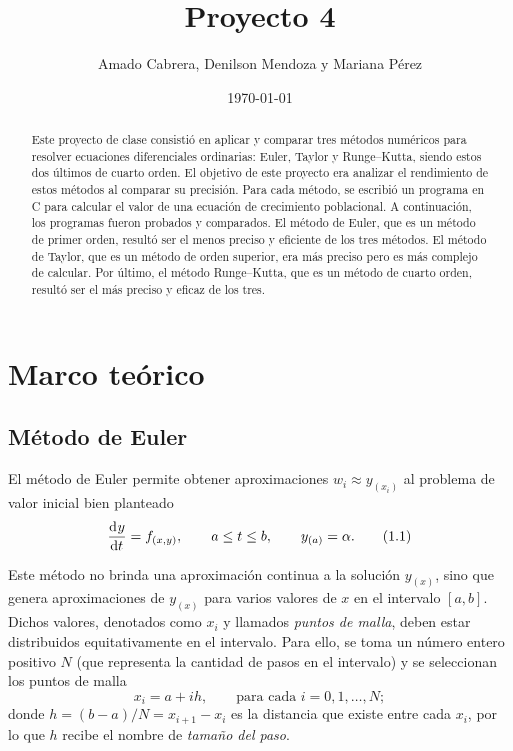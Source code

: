 \documentclass[
    english, spanish, Ce-table, Ce-theorem
]{CabesHW}
\institute{Escuela de Ciencias Físicas y Matemática}
\title{Proyecto 4}
\author{Amado Cabrera, Denilson Mendoza y Mariana Pérez}
\date{\today}
\begin{document}
\maketitle

\begin{abstract}
Este proyecto de clase consistió en aplicar y comparar tres métodos numéricos para resolver ecuaciones diferenciales ordinarias: Euler, Taylor y Runge--Kutta, siendo estos dos últimos de cuarto orden. El objetivo de este proyecto era analizar el rendimiento de estos métodos al comparar su precisión. Para cada método, se escribió un programa en C para calcular el valor de una ecuación de crecimiento poblacional. A continuación, los programas fueron probados y comparados. El método de Euler, que es un método de primer orden, resultó ser el menos preciso y eficiente de los tres métodos. El método de Taylor, que es un método de orden superior, era más preciso pero es más complejo de calcular. Por último, el método Runge--Kutta, que es un método de cuarto orden, resultó ser el más preciso y eficaz de los tres.
\end{abstract}

\vspace{0.5em}
\section{Marco teórico}
\subsection{Método de Euler}
El método de Euler permite obtener aproximaciones $w_i \approx y_{(x_i)}$ al problema de valor inicial bien planteado
\begin{align*}
\label{1.1}
    \td{y}{t} = f_{(x,y)}, \qquad a \leq t \leq b, \qquad y_{(a)} = \alpha. \tag{1.1}
\end{align*}

Este método no brinda una aproximación continua a la solución $y_{(x)}$, sino que genera aproximaciones de $y_{(x)}$ para varios valores de $x$ en el intervalo $[a, b]$. Dichos valores, denotados como $x_i$ y llamados \textit{puntos de malla}, deben estar distribuidos equitativamente en el intervalo. Para ello, se toma un número entero positivo $N$ (que representa la cantidad de pasos en el intervalo) y se seleccionan los puntos de malla
\[ x_i = a + ih, \qquad \text{para cada $i = 0, 1, \ldots, N$}; \]
donde $h = (b-a)/N = x_{i+1} - x_i$ es la distancia que existe entre cada $x_i$, por lo que $h$ recibe el nombre de \textit{tamaño del paso}.
\end{document}
